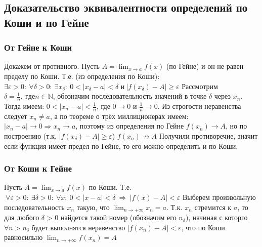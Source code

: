 \subsection{Доказательство эквивалентности определений по Коши и по Гейне}
\subsubsection{От Гейне к Коши}
Докажем от противного. Пусть $\displaystyle A = \lim_{x \to a} f(x)$ (по Гейне) и он не равен пределу по Коши. Т.е. (из определения по Коши):\newline
$\exists \varepsilon > 0:\ \forall \delta > 0:\ \exists x_{\delta} : \ 0<|x_{\delta} - a| < \delta$ и$\  |f(x_{\delta}) - A| \geq \varepsilon$ \newline
Рассмотрим $\delta = \frac{1}{n},\ где n \in \mathbb{N}$, обозначим последовательность значений в точке $\delta$ через $x_n$. Тогда имеем:\newline
$0 < |x_n - a| < \frac{1}{n}$, где $0 \to 0$ и $\frac{1}{n} \to 0$.
Из строгости неравенства следует $x_n \neq a$, а по теореме о трёх миллиционерах имеем:\newline
$|x_n - a| \to 0 \Rightarrow x_n \to a$, поэтому из определения по Гейне $f(x_n) \to A$, но по построению (т.к. $|f(x_{\delta}) - A| \geq \varepsilon$) $f(x_n) \not\to A$\newline\newline
Получили противоречие, значит если функция имеет предел по Гейне, то его можно определить и по Коши.

\subsubsection{От Коши к Гейне}
Пусть $\displaystyle A = \lim_{x \to a} f(x)$ по Коши. Т.е.\newline
$\displaystyle\ \forall \varepsilon > 0 : \ \exists \delta > 0: \ \forall x : \ 0 < |x - a| < \delta \ \Rightarrow \ |f(x) - A| < \varepsilon $\newline
Выберем произвольную последовательность  $x_n$  такую, что  $\displaystyle \lim_{n \to +\infty} x_n = a$. Т.к. $x_n$ стремится к $a$, то для любого $\delta$ > 0 найдется такой номер (обозначим его $n_\delta$), начиная с которго $\forall n>n_\delta$ будет выполнятся неравенство $|f(x_n) - A|<\varepsilon$, что по Коши равносильно $\displaystyle \lim_{n \to +\infty} f(x_n) = A$

